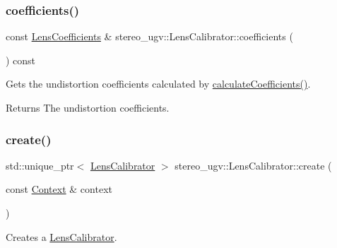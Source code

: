 \subsubsection{\texorpdfstring{coefficients()}{coefficients()}}
{\footnotesize\ttfamily const \hyperlink{structstereo__ugv_1_1LensCoefficients}{Lens\+Coefficients} \& stereo\+\_\+ugv\+::\+Lens\+Calibrator\+::coefficients (\begin{DoxyParamCaption}{ }\end{DoxyParamCaption}) const\hspace{0.3cm}{\ttfamily [noexcept]}}



Gets the undistortion coefficients calculated by \hyperlink{classstereo__ugv_1_1LensCalibrator_aeeb532144b29ae7004ee14e2695def97}{calculate\+Coefficients()}. 

\begin{DoxyReturn}{Returns}
The undistortion coefficients. 
\end{DoxyReturn}
\mbox{\label{classstereo__ugv_1_1LensCalibrator_ae19b071e8cb8c015351d4717f79f9184}} 
\subsubsection{\texorpdfstring{create()}{create()}}
{\footnotesize\ttfamily std\+::unique\+\_\+ptr$<$ \hyperlink{classstereo__ugv_1_1LensCalibrator}{Lens\+Calibrator} $>$ stereo\+\_\+ugv\+::\+Lens\+Calibrator\+::create (\begin{DoxyParamCaption}\item[{const \hyperlink{classstereo__ugv_1_1Context}{Context} \&}]{context }\end{DoxyParamCaption})\hspace{0.3cm}{\ttfamily [static]}}



Creates a \hyperlink{classstereo__ugv_1_1LensCalibrator}{Lens\+Calibrator}. 

